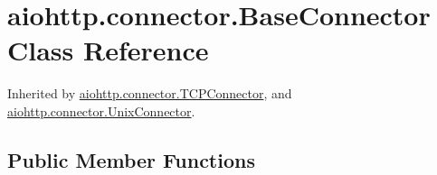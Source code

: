 \hypertarget{classaiohttp_1_1connector_1_1_base_connector}{}\section{aiohttp.\+connector.\+Base\+Connector Class Reference}
\label{classaiohttp_1_1connector_1_1_base_connector}


Inherited by \hyperlink{classaiohttp_1_1connector_1_1_t_c_p_connector}{aiohttp.\+connector.\+T\+C\+P\+Connector}, and \hyperlink{classaiohttp_1_1connector_1_1_unix_connector}{aiohttp.\+connector.\+Unix\+Connector}.

\subsection*{Public Member Functions}

